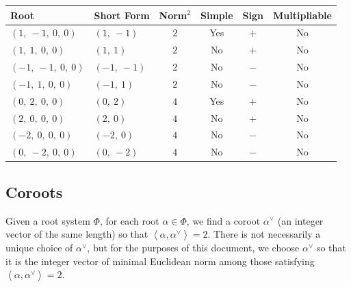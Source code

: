 \documentclass[11pt]{article}
\newcommand{\noi}{\noindent}
\newcommand{\la}{\left\langle}
\newcommand{\ra}{\right\rangle}
\theoremstyle{definition}
\begin{document}
\noi \begin{tabular}{|l|l|c|c|c|c|}
    \hline
    \textbf{Root} & \textbf{Short Form} & \textbf{Norm$^2$} & \textbf{Simple} & \textbf{Sign} & \textbf{Multipliable} \\
    \hline
    $\left( 1, \  -1, \  0, \  0\right)$ & $\left( 1, \  -1\right)$ & $2$ & Yes & $+$ & No \\
    \hline
    $\left( 1, \  1, \  0, \  0\right)$ & $\left( 1, \  1\right)$ & $2$ & No & $+$ & No \\
    \hline
    $\left( -1, \  -1, \  0, \  0\right)$ & $\left( -1, \  -1\right)$ & $2$ & No & $-$ & No \\
    \hline
    $\left( -1, \  1, \  0, \  0\right)$ & $\left( -1, \  1\right)$ & $2$ & No & $-$ & No \\
    \hline
    $\left( 0, \  2, \  0, \  0\right)$ & $\left( 0, \  2\right)$ & $4$ & Yes & $+$ & No \\
    \hline
    $\left( 2, \  0, \  0, \  0\right)$ & $\left( 2, \  0\right)$ & $4$ & No & $+$ & No \\
    \hline
    $\left( -2, \  0, \  0, \  0\right)$ & $\left( -2, \  0\right)$ & $4$ & No & $-$ & No \\
    \hline
    $\left( 0, \  -2, \  0, \  0\right)$ & $\left( 0, \  -2\right)$ & $4$ & No & $-$ & No \\
    \hline
\end{tabular}


\subsection{Coroots}

Given a root system $\Phi$, for each root $\alpha \in \Phi$, we find a coroot $\alpha^\vee$ (an integer vector of the same length) so that $\la \alpha, \alpha^\vee \ra = 2$. There is not necessarily a unique choice of $\alpha^\vee$, but for the purposes of this document, we choose $\alpha^\vee$ so that it is the integer vector of minimal Euclidean norm among those satisfying $\la \alpha, \alpha^\vee \ra = 2$.

\bigskip
\end{document}
